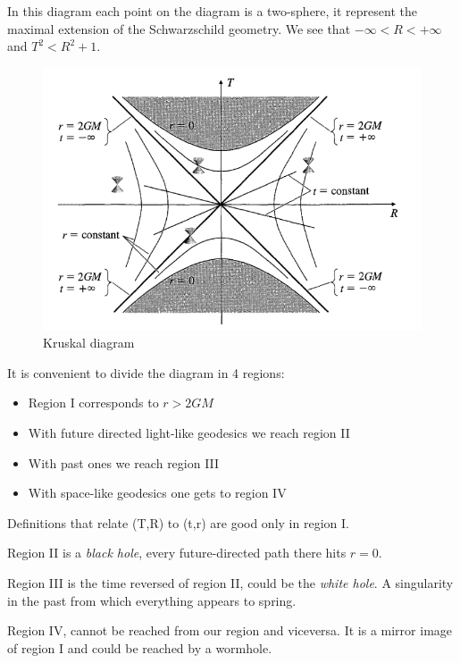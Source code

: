 In this diagram each point on the diagram is a two-sphere, it represent the maximal extension of the Schwarzschild geometry.
We see that $-\infty < R < +\infty$ and $T^{2}< R^{2 }+1$.
\begin{figure}[h]
\centering
\includegraphics[width=\linewidth]{imm/ksdiagram.png}
\caption{Kruskal diagram}
\label{imm:ksdiagram}
\end{figure}
It is convenient to divide the diagram in 4 regions:
\begin{itemize}
\item Region I corresponds to $r>2GM$
\item With future directed light-like geodesics we reach region II
\item With past ones we reach region III
\item With space-like geodesics one gets to region IV
\end{itemize}
Definitions that relate (T,R) to (t,r) are good only in region I.\par
Region II is a \emph{black hole}, every future-directed path there hits $r=0$.\par
Region III is the time reversed of region II, could be the \emph{ white hole}. A singularity in the past from which everything appears to spring.\par
Region IV, cannot be reached from our region and viceversa. It is a mirror image of region I and could be reached by a wormhole.
